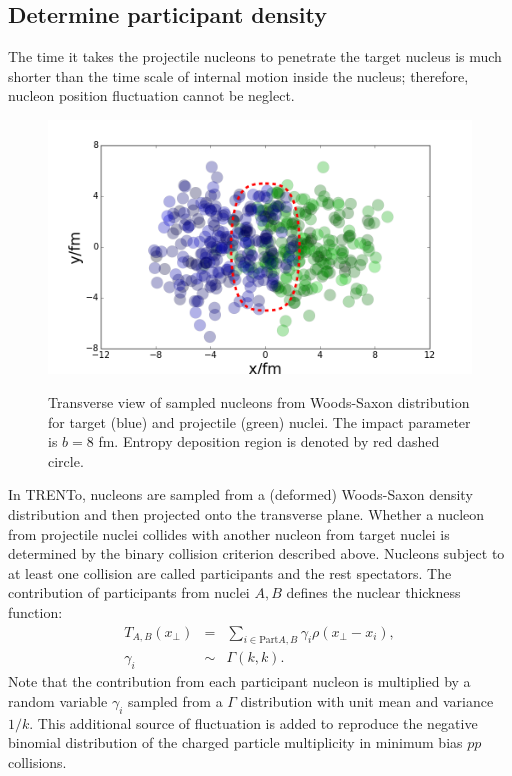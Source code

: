 \documentclass[aps,prl,twocolumn,groupedaddress]{revtex4-1}
\begin{document}
	\subsection{Determine participant density}
	The time it takes the projectile nucleons to penetrate the target nucleus is much shorter than the time scale of internal motion inside the nucleus; therefore, nucleon position fluctuation cannot be neglect.
	\begin{figure}
	\begin{center}
	\includegraphics[width=\columnwidth]{pics/nuclei.png}
	\label{nuclei}
	\caption{Transverse view of sampled nucleons from Woods-Saxon distribution for target (blue) and projectile (green) nuclei. The impact parameter is $b = 8$ fm. Entropy deposition region is denoted by red dashed circle.}
	\end{center}
	\end{figure}
	
	In TRENTo, nucleons are sampled from a (deformed) Woods-Saxon density distribution and then projected onto the transverse plane. 
	Whether a nucleon from projectile nuclei collides with another nucleon from target nuclei is determined by the binary collision criterion described above. 
	Nucleons subject to at least one collision are called participants and the rest spectators.
	The contribution of participants from nuclei $A,B$ defines the nuclear thickness function:
	\begin{eqnarray}
		T_{A,B}(x_\perp) &=& \sum_{i \in \textrm{Part} A,B} \gamma_i \rho(x_\perp- x_i), \\
		\gamma_i &\sim& \Gamma(k, k).
	\end{eqnarray}
	Note that the contribution from each participant nucleon is multiplied by a random variable $\gamma_i$ sampled from a $\Gamma$ distribution with unit mean and variance $1/k$. 
	This additional source of fluctuation is added to reproduce the negative binomial distribution of the charged particle multiplicity in minimum bias $pp$ collisions.
\end{document}
